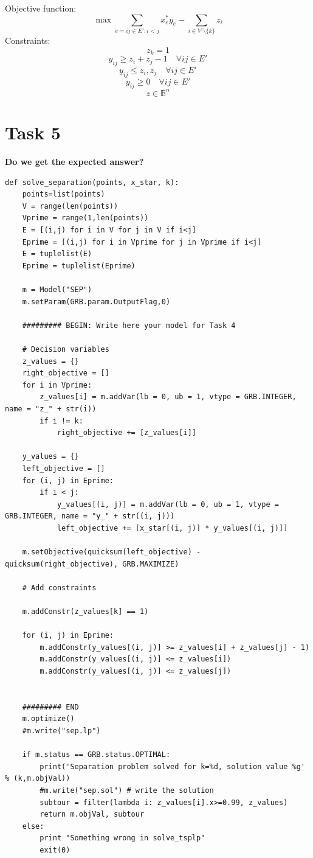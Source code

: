 \documentclass[a4paper,10pt]{article}
\begin{document}
Objective function:
$$ \max \sum_{e=ij\in E':i < j} x^*_e y_e - \sum_{i \in V' \setminus \{k\}} z_i $$
Constraints:
$$ z_k = 1 $$
$$ y_{ij} \geq z_i + z_j - 1 \quad \forall ij \in E' $$
$$ y_{ij} \leq z_i,z_j \quad \forall ij \in E' $$
$$ y_{ij} \geq 0 \quad \forall ij \in E' $$
$$ z \in \mathbb{B}^n $$

\newpage
\section*{Task 5}

\textbf{Do we get the expected answer?}

\begin{lstlisting}
def solve_separation(points, x_star, k):
    points=list(points)
    V = range(len(points))
    Vprime = range(1,len(points))
    E = [(i,j) for i in V for j in V if i<j]
    Eprime = [(i,j) for i in Vprime for j in Vprime if i<j]
    E = tuplelist(E)
    Eprime = tuplelist(Eprime)

    m = Model("SEP")
    m.setParam(GRB.param.OutputFlag,0)
    
    ######### BEGIN: Write here your model for Task 4

    # Decision variables
    z_values = {}
    right_objective = []
    for i in Vprime:
        z_values[i] = m.addVar(lb = 0, ub = 1, vtype = GRB.INTEGER, name = "z_" + str(i))
        if i != k:
            right_objective += [z_values[i]]
    
    y_values = {}
    left_objective = []
    for (i, j) in Eprime:
        if i < j:
            y_values[(i, j)] = m.addVar(lb = 0, ub = 1, vtype = GRB.INTEGER, name = "y_" + str((i, j)))
            left_objective += [x_star[(i, j)] * y_values[(i, j)]]
    
    m.setObjective(quicksum(left_objective) - quicksum(right_objective), GRB.MAXIMIZE)
    
    # Add constraints
    
    m.addConstr(z_values[k] == 1)
    
    for (i, j) in Eprime:
        m.addConstr(y_values[(i, j)] >= z_values[i] + z_values[j] - 1)
        m.addConstr(y_values[(i, j)] <= z_values[i])
        m.addConstr(y_values[(i, j)] <= z_values[j])
            
    
    ######### END
    m.optimize()
    #m.write("sep.lp")
    
    if m.status == GRB.status.OPTIMAL:
        print('Separation problem solved for k=%d, solution value %g' % (k,m.objVal))
        #m.write("sep.sol") # write the solution    
        subtour = filter(lambda i: z_values[i].x>=0.99, z_values)
        return m.objVal, subtour
    else:
        print "Something wrong in solve_tsplp"
        exit(0)
\end{lstlisting}
\end{document}
